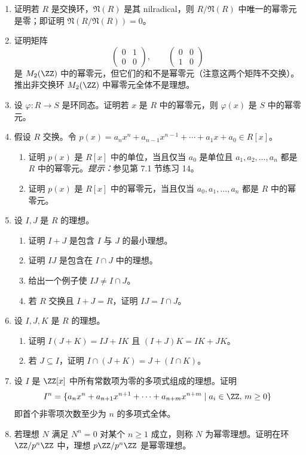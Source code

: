 \begin{enumerate}[label=\arabic*.]
	\item 证明若 $R$ 是交换环，$\mathfrak N(R)$ 是其 nilradical，则 $R/\mathfrak N(R)$ 中唯一的幂零元是零；即证明 $\mathfrak N(R/\mathfrak N(R))=0$。
	\item 证明矩阵
	\[
	\begin{pmatrix}0&1\\0&0\end{pmatrix},
	\qquad
	\begin{pmatrix}0&0\\1&0\end{pmatrix}
	\]
	是 $M_2(\ZZ)$ 中的幂零元，但它们的和不是幂零元（注意这两个矩阵不交换）。推出非交换环 $M_2(\ZZ)$ 中幂零元全体不是理想。
	\item 设 $\varphi:R\to S$ 是环同态。证明若 $x$ 是 $R$ 中的幂零元，则 $\varphi(x)$ 是 $S$ 中的幂零元。
	\item 假设 $R$ 交换。令 $p(x)=a_nx^n+a_{n-1}x^{n-1}+\cdots+a_1x+a_0\in R[x]$。
	\begin{enumerate}[label=(\alph*)]
		\item 证明 $p(x)$ 是 $R[x]$ 中的单位，当且仅当 $a_0$ 是单位且 $a_1,a_2,\ldots,a_n$ 都是 $R$ 中的幂零元。\emph{提示：}参见第 7.1 节练习 14。
		\item 证明 $p(x)$ 是 $R[x]$ 中的幂零元，当且仅当 $a_0,a_1,\ldots,a_n$ 都是 $R$ 中的幂零元。
	\end{enumerate}
	\item 设 $I,J$ 是 $R$ 的理想。
	\begin{enumerate}[label=(\alph*)]
		\item 证明 $I+J$ 是包含 $I$ 与 $J$ 的最小理想。
		\item 证明 $IJ$ 是包含在 $I\cap J$ 中的理想。
		\item 给出一个例子使 $IJ\neq I\cap J$。
		\item 若 $R$ 交换且 $I+J=R$，证明 $IJ=I\cap J$。
	\end{enumerate}
	\item 设 $I,J,K$ 是 $R$ 的理想。
	\begin{enumerate}[label=(\alph*)]
		\item 证明 $I(J+K)=IJ+IK$ 且 $(I+J)K=IK+JK$。
		\item 若 $J\subseteq I$，证明 $I\cap(J+K)=J+(I\cap K)$。
	\end{enumerate}
	\item 设 $I$ 是 $\ZZ[x]$ 中所有常数项为零的多项式组成的理想。证明
	\[
	I^n=\{a_nx^n+a_{n+1}x^{n+1}+\cdots+a_{n+m}x^{n+m}\mid a_i\in\ZZ,\,m\geq0\}
	\]
	即首个非零项次数至少为 $n$ 的多项式全体。
	\item 若理想 $N$ 满足 $N^n=0$ 对某个 $n\geq1$ 成立，则称 $N$ 为幂零理想。证明在环 $\ZZ/p^n\ZZ$ 中，理想 $p\ZZ/p^n\ZZ$ 是幂零理想。
\end{enumerate}



